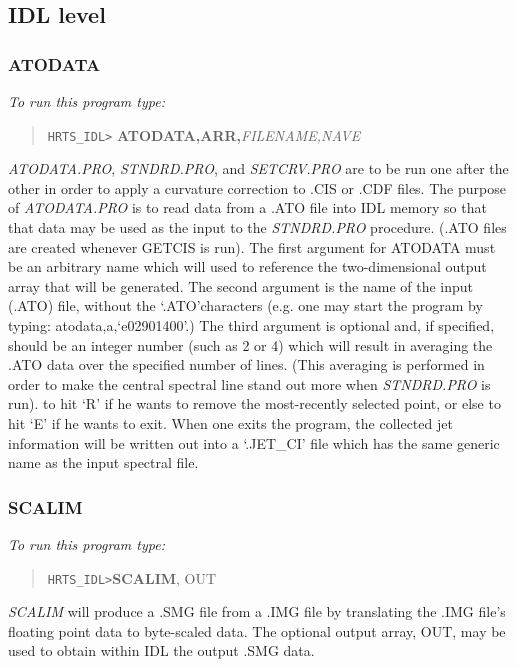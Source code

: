 \subsection{IDL level}

\subsubsection{ATODATA}

{\em To run this program type:}

\begin{quote}   
      {\tt HRTS\_IDL>} {\bf ATODATA,ARR,}{\it FILENAME,NAVE}        
\end{quote}   
{\em ATODATA.PRO}, {\em STNDRD.PRO}, and {\em SETCRV.PRO} are to be run one 
after the
   other in order to apply a curvature correction to .CIS or .CDF files.
   The purpose of {\em ATODATA.PRO} is to read data from a .ATO file into IDL
   memory so that that data may be used as the input to the {\em STNDRD.PRO}
   procedure.  (.ATO files are created whenever GETCIS is run).  The first
   argument for ATODATA must be an arbitrary name which will used to
   reference the two-dimensional output array that will be generated.  The
   second argument is the name of the input (.ATO) file, without the
   `.ATO'characters (e.g. one may start the program by typing:
   atodata,a,`e02901400'.) The third argument is
   optional and, if specified, should be an integer number (such as 2 or
   4) which will result in averaging the .ATO data over the specified
   number of lines.  (This averaging is performed in order to make the
   central spectral line stand out more when {\em STNDRD.PRO} is run).
   to hit `R' if he wants to remove the most-recently selected point, or
   else to hit `E' if he wants to exit.  When one exits the program, the
   collected jet information will be written out into a `.JET\_CI' file
   which has the same generic name as the input spectral file.

\subsubsection{SCALIM}

{\em To run this program type:}
\begin{quote}
     {\tt HRTS\_IDL>}{\bf SCALIM}, OUT           
\end{quote}   
{\em SCALIM} will produce a .SMG file from a .IMG file by translating the
   .IMG file's floating point data to byte-scaled data.  The optional
   output array, OUT, may be used to obtain within IDL the output .SMG
   data.

